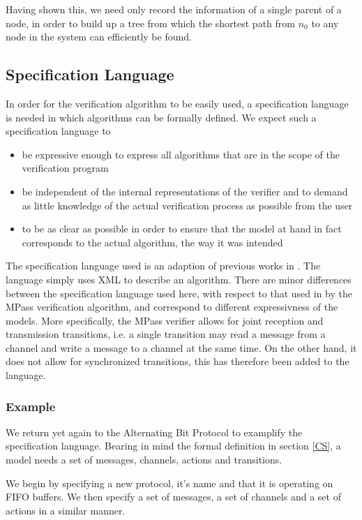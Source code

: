 Having shown this, we need only record the information of a single parent of a node, in order to build up a tree from which the shortest path from $n_0$ to any node in the system can efficiently be found.


\subsection{Specification Language}
\label{speclang}
In order for the verification algorithm to be easily used, a specification language is needed in which algorithms can be formally defined. We expect such a specification language to

\begin{itemize}
\item
be expressive enough to express all algorithms that are in the scope of the verification program
\item
be independent of the internal representations of the verifier and to demand as little knowledge of the actual verification process as possible from the user
\item
to be as clear as possible in order to ensure that the model at hand in fact corresponds to the actual algorithm, the way it was intended
\end{itemize}

The specification language used is an adaption of previous works in \cite{mpass}. The language simply uses XML to describe an algorithm. There are minor differences between the specification language used here, with respect to that used in by the MPass verification algorithm, and correspond to different expressivness of the models. More specifically, the MPass verifier allows for joint reception and transmission transitions, i.e. a single transition may read a message from a channel and write a message to a channel at the same time. On the other hand, it does not allow for synchronized transitions, this has therefore been added to the language.

\subsubsection{Example}
We return yet again to the Alternating Bit Protocol to examplify the specification language. Bearing in mind the formal definition in section \ref{CS}, a model needs a set of messages, channels, actions and transitions.

We begin by specifying a new protocol, it's name and that it is operating on FIFO buffers. We then specify a set of messages, a set of channels and a set of actions in a similar manner.

